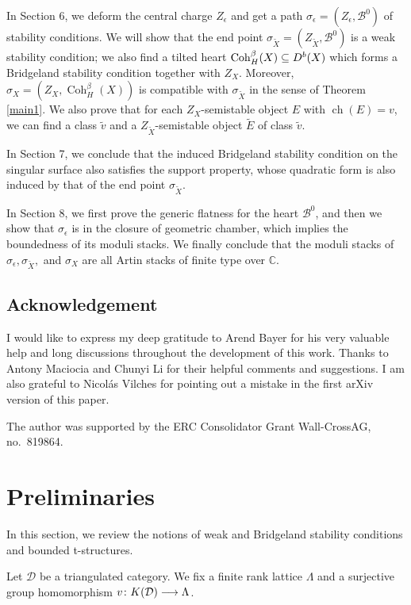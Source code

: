 \documentclass[12pt]{amsart}
\theoremstyle{definition}
\DeclareMathOperator{\Coh}{Coh}
\DeclareMathOperator{\ch}{ch}
\begin{document}
In Section 6, we deform the central charge $Z_\epsilon$ and get a path $\sigma_\epsilon = (Z_\epsilon, \mathcal{B}^0)$ of stability conditions.
We will show that the end point $\sigma_{\widetilde{X}} = (Z_{\widetilde{X}}, \mathcal{B}^0)$ is a weak stability condition;
we also find a tilted heart $\Coh^\beta_H(X) \subseteq {\rm D}^b(X)$ which forms a Bridgeland stability condition together with $Z_X$.
Moreover, $\sigma_X=(Z_X,\Coh^\beta_H(X))$ is compatible with $\sigma_{\widetilde{X}}$ in the sense of Theorem \ref{main1}.
We also prove that for each $Z_X$-semistable object $E$ with $\ch(E)=v$,
we can find a class $\widetilde{v}$ and 
a $Z_{\widetilde{X}}$-semistable object $\widetilde{E}$ of class $\widetilde{v}$.

In Section 7, we conclude that the induced Bridgeland stability condition on the singular surface also satisfies the support property, whose quadratic form is also induced by that of the end point $\sigma_{\widetilde{X}}$.

In Section 8, we first prove the generic flatness for the heart $\mathcal{B}^0$, 
and then we show that $\sigma_\epsilon$ is in the closure of geometric chamber,
which implies the boundedness of its moduli stacks.
We finally conclude that the moduli stacks of $\sigma_\epsilon, \sigma_{\widetilde{X}},$ and $\sigma_X$ are all Artin stacks of finite type over $\mathbb{C}$.

\subsection{Acknowledgement}
I would like to express my deep gratitude to Arend Bayer for his very valuable help and long discussions throughout the development of this work.
Thanks to Antony Maciocia and Chunyi Li for their helpful comments and suggestions.
I am also grateful to Nicolás Vilches for pointing out a mistake in the first arXiv version of this paper. 

The author was supported by the ERC Consolidator Grant Wall-CrossAG, no.\ 819864.


\printglossary[title= List of Notations]



\section{Preliminaries}
In this section, we review the notions of weak and Bridgeland stability conditions and bounded t-structures.

Let $\mathcal{D}$ be a triangulated category. We fix a finite rank lattice $\Lambda$ and a surjective group homomorphism $v\colon {\rm K}(\mathcal{D}) \longrightarrow \Lambda$. 
\end{document}
